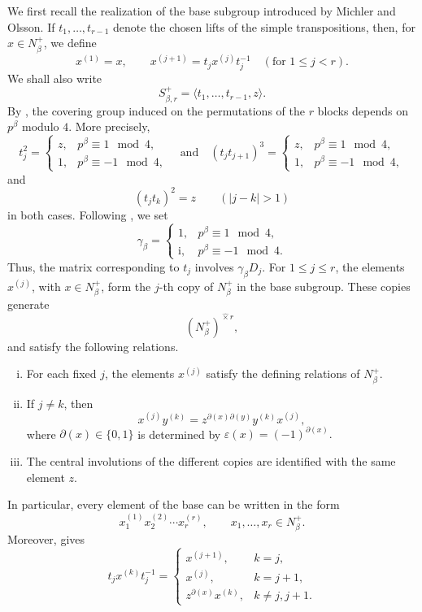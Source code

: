 \documentclass[reqno]{amsart}
\theoremstyle{definition}
\begin{document}
We first recall the realization of the base subgroup introduced by
Michler and Olsson. If $t_1,\ldots,t_{r-1}$ denote the chosen lifts of
the simple transpositions, then, for $x\in N_\beta^+$, we define
\[
x^{(1)}=x,
\qquad
x^{(j+1)}=t_jx^{(j)}t_j^{-1}
\quad (\text{for }1\leq j<r).
\]
We shall also write
\[
S_{\beta,r}^+
=
\langle t_1,\ldots,t_{r-1},z\rangle.
\]
By \cite[Lemma~3.5]{MichlerOlsson}, the covering group induced on the
permutations of the $r$ blocks depends on $p^\beta$ modulo $4$. More
precisely,
\begin{equation}
\label{eq:splus1}
t_j^2=
\begin{cases}
z,&p^\beta\equiv1\mod4,\\
1,&p^\beta\equiv-1\mod4,
\end{cases}
\quad\text{and}\quad
(t_jt_{j+1})^3
=
\begin{cases}
z,&p^\beta\equiv1\mod4,\\
1,&p^\beta\equiv-1\mod4,
\end{cases}
\end{equation}
and
\begin{equation}
\label{eq:splus2}
(t_jt_k)^2=z
\qquad (|j-k|>1)
\end{equation}
in both cases. Following \cite[Lemma~4.2(8)]{MichlerOlsson},
we set
\begin{equation}
\label{eq:defsignechoix}
\gamma_\beta=
\begin{cases}
1,&p^\beta\equiv1\mod4,\\
\mathrm i,&p^\beta\equiv-1\mod4.
\end{cases}
\end{equation}
Thus, the matrix corresponding to $t_j$ involves $\gamma_\beta D_j$.
For $1\leq j\leq r$, the elements $x^{(j)}$, with $x\in N_\beta^+$, form
the $j$-th copy of $N_\beta^+$ in the base subgroup. These copies generate
\[
(N_\beta^+)^{\widehat\times r},
\]
and satisfy the following relations.
\begin{enumerate}[(i)]
\item For each fixed $j$, the elements $x^{(j)}$ satisfy the
defining relations of $N_\beta^+$.

\item If $j\neq k$, then
\[
x^{(j)}y^{(k)}
=
z^{\partial(x)\partial(y)}
y^{(k)}x^{(j)},
\]
where $\partial(x)\in\{0,1\}$ is determined by
$
\varepsilon(x)=(-1)^{\partial(x)}.
$

\item The central involutions of the different copies are
identified with the same element $z$.
\end{enumerate}
In particular, every element of the base can be written in the form
\[
x_1^{(1)}x_2^{(2)}\cdots x_r^{(r)},
\qquad x_1,\ldots,x_r\in N_\beta^+.
\]
Moreover, \cite[p.~92]{MichlerOlsson} gives
\[
t_jx^{(k)}t_j^{-1}
=
\begin{cases}
x^{(j+1)},&k=j,\\
x^{(j)},&k=j+1,\\
z^{\partial(x)}x^{(k)},&k\neq j,j+1.
\end{cases}
\]
\end{document}
